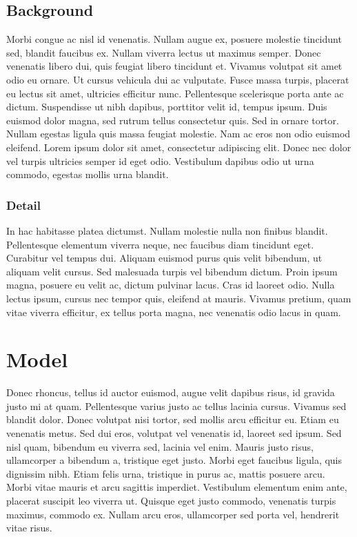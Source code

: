 \documentclass[]{aiaa-tc}%
\begin{document}
\subsection{Background}

Morbi congue ac nisl id venenatis. Nullam augue ex, posuere molestie tincidunt sed, blandit faucibus ex. Nullam viverra lectus ut maximus semper. Donec venenatis libero dui, quis feugiat libero tincidunt et. Vivamus volutpat sit amet odio eu ornare. Ut cursus vehicula dui ac vulputate. Fusce massa turpis, placerat eu lectus sit amet, ultricies efficitur nunc. Pellentesque scelerisque porta ante ac dictum. Suspendisse ut nibh dapibus, porttitor velit id, tempus ipsum. Duis euismod dolor magna, sed rutrum tellus consectetur quis. Sed in ornare tortor. Nullam egestas ligula quis massa feugiat molestie. Nam ac eros non odio euismod eleifend. Lorem ipsum dolor sit amet, consectetur adipiscing elit. Donec nec dolor vel turpis ultricies semper id eget odio. Vestibulum dapibus odio ut urna commodo, egestas mollis urna blandit.


\subsubsection{Detail}

In hac habitasse platea dictumst. Nullam molestie nulla non finibus blandit. Pellentesque elementum viverra neque, nec faucibus diam tincidunt eget. Curabitur vel tempus dui. Aliquam euismod purus quis velit bibendum, ut aliquam velit cursus. Sed malesuada turpis vel bibendum dictum. Proin ipsum magna, posuere eu velit ac, dictum pulvinar lacus. Cras id laoreet odio. Nulla lectus ipsum, cursus nec tempor quis, eleifend at mauris. Vivamus pretium, quam vitae viverra efficitur, ex tellus porta magna, nec venenatis odio lacus in quam.


\section{Model}

Donec rhoncus, tellus id auctor euismod, augue velit dapibus risus, id gravida justo mi at quam. Pellentesque varius justo ac tellus lacinia cursus. Vivamus sed blandit dolor. Donec volutpat nisi tortor, sed mollis arcu efficitur eu. Etiam eu venenatis metus. Sed dui eros, volutpat vel venenatis id, laoreet sed ipsum. Sed nisl quam, bibendum eu viverra sed, lacinia vel enim. Mauris justo risus, ullamcorper a bibendum a, tristique eget justo. Morbi eget faucibus ligula, quis dignissim nibh. Etiam felis urna, tristique in purus ac, mattis posuere arcu. Morbi vitae mauris et arcu sagittis imperdiet. Vestibulum elementum enim ante, placerat suscipit leo viverra ut. Quisque eget justo commodo, venenatis turpis maximus, commodo ex. Nullam arcu eros, ullamcorper sed porta vel, hendrerit vitae risus.
\end{document}
